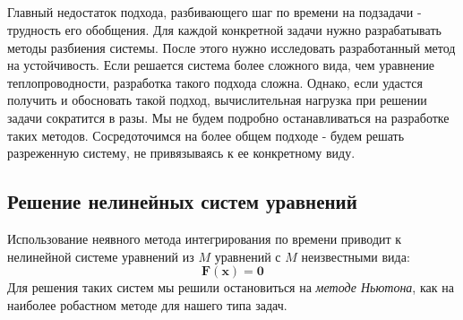 \subsection*{}
Главный недостаток подхода, разбивающего шаг по времени на подзадачи - трудность его обобщения. Для каждой конкретной задачи нужно разрабатывать методы разбиения системы. После этого нужно исследовать разработанный метод на устойчивость. Если решается система более сложного вида, чем уравнение теплопроводности, разработка такого подхода сложна. Однако, если удастся получить и обосновать такой подход, вычислительная нагрузка при решении задачи сократится в разы. Мы не будем подробно останавливаться на разработке таких методов. Сосредоточимся на более общем подходе - будем решать разреженную систему, не привязываясь к ее конкретному виду.

\subsection{Решение нелинейных систем уравнений \label{methods:newton}}
Использование неявного метода интегрирования по времени приводит к нелинейной системе уравнений из $M$ уравнений с $M$ неизвестными вида:
\begin{equation}\label{eq:newtons_method_system}
\mathbf{F}(\mathbf{x}) = \mathbf{0}
\end{equation}
Для решения таких систем мы решили остановиться на \textit{методе Ньютона}, как на наиболее робастном методе для нашего типа задач. 
